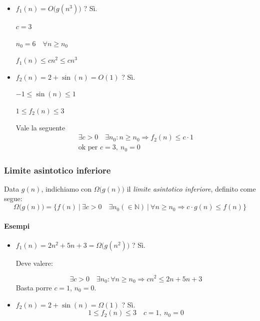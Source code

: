 \begin{itemize}
	\item $f_1(n) = O \big(g(n^3) \big)$ ? Sì. \par
	$c = 3 $\par
	$n_0 = 6 \quad \forall n \geq n_0$ \par
	$f_1(n) \leq cn^2 \leq cn^3$
	
	\item $f_2(n) = 2 + \sin (n) = O(1)$ ? Sì. \par
	$-1 \leq \sin (n) \leq 1$ \par
	$1 \leq f_2(n) \leq 3$ \par
	Vale la seguente
	\begin{gather*}
		\exists c > 0 \quad \exists n_0 : n \geq n_0 \Rightarrow f_2(n) \leq c \cdot 1 \\
		\text{ok per } c = 3, \ n_0 = 0
	\end{gather*}
\end{itemize}

\subsubsection{Limite asintotico inferiore}
Data $g(n)$, indichiamo con $\Omega \big(g(n) \big)$ il \emph{limite asintotico inferiore}, definito come segue:
\begin{displaymath}
	\Omega \big(g(n) \big) = \{ f(n) \ \vert \ \exists c > 0 \quad \exists n_0 (\in \mathbb{N}) \ \vert \ \forall n \geq n_0 \Rightarrow c \cdot g(n) \leq f(n) \}
\end{displaymath}

\paragraph{Esempi}
\begin{itemize}
	\item $f_1(n) = 2n^2 + 5n + 3 = \Omega \big(g(n^2) \big)$ ? Sì.\par
	Deve valere: \par
	\begin{displaymath}
		\exists c > 0 \quad \exists n_0 : \forall n \geq n_0 \Rightarrow cn^2 \leq 2n + 5n + 3
	\end{displaymath}
	Basta porre $c = 1$, $n_0 = 0$.
	
	\item $f_2(n) = 2 + \sin (n) = \Omega (1)$ ? Sì.
	\begin{displaymath}
		1 \leq f_2(n) \leq 3 \quad c = 1, \ n_0 = 0
	\end{displaymath}
\end{itemize}


